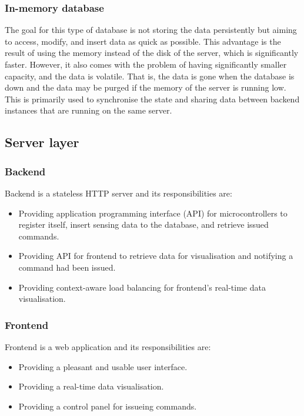 \documentclass[../thesis.tex]{subfiles}
\begin{document}
\subsubsection{In-memory database}

The goal for this type of database is not storing the data persistently but aiming to access, modify, and insert data as quick as possible. This advantage is the result of using the memory instead of the disk of the server, which is significantly faster. However, it also comes with the problem of having significantly smaller capacity, and the data is volatile. That is, the data is gone when the database is down and the data may be purged if the memory of the server is running low. This is primarily used to synchronise the state and sharing data between backend instances that are running on the same server. 

\subsection{Server layer}

\subsubsection{Backend}

Backend is a stateless HTTP server and its responsibilities are:

\begin{itemize}
	\item Providing application programming interface (API) for microcontrollers to register itself, insert sensing data to the database, and retrieve issued commands.
	\item Providing API for frontend to retrieve data for visualisation and notifying a command had been issued.
	\item Providing context-aware load balancing for frontend's real-time data visualisation. 
\end{itemize}

\subsubsection{Frontend}

Frontend is a web application and its responsibilities are: 

\begin{itemize}
	\item Providing a pleasant and usable user interface.
	\item Providing a real-time data visualisation.
	\item Providing a control panel for issueing commands.
\end{itemize}
\end{document}
